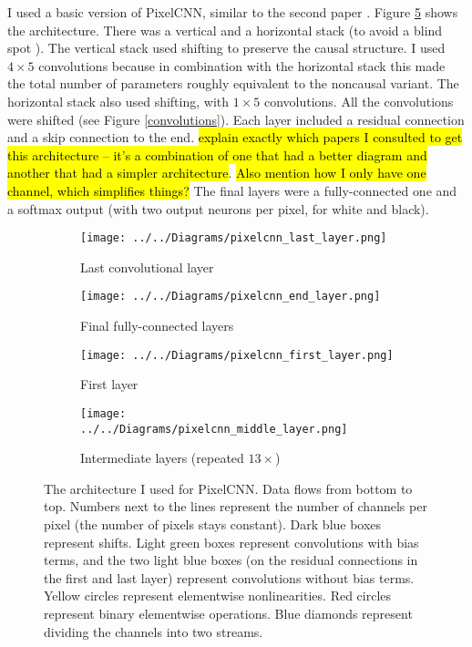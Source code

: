 \documentclass[11pt, a4paper]{book}
\begin{document}
I used a basic version of PixelCNN, similar to the second paper \citep{pixelcnn2}. Figure \ref{pixelcnn} shows the architecture. There was a vertical and a horizontal stack (to avoid a blind spot \citep{pixelcnn2}). The vertical stack used shifting to preserve the causal structure. I used $4\times 5$ convolutions because in combination with the horizontal stack this made the total number of parameters roughly equivalent to the noncausal variant. The horizontal stack also used shifting, with $1\times 5$ convolutions. All the convolutions were shifted (see Figure \ref{convolutions}). Each layer included a residual connection and a skip connection to the end. \hl{explain exactly which papers I consulted to get this architecture -- it's a combination of one that had a better diagram and another that had a simpler architecture}. \hl{Also mention how I only have one channel, which simplifies things?} The final layers were a fully-connected one and a softmax output (with two output neurons per pixel, for white and black).

\begin{figure}
  \centering
    \begin{subfigure}{0.45\columnwidth}
    	\addtocounter{subfigure}{2}
        \centering
        \caption{Last convolutional layer}
        \texttt{[image: ../../Diagrams/pixelcnn\_last\_layer.png]} 
        \label{pixelcnn:last}
    \end{subfigure}
    \hfill
    \begin{subfigure}{0.45\columnwidth}
        \centering
        \caption{Final fully-connected layers}
        \texttt{[image: ../../Diagrams/pixelcnn\_end\_layer.png]} 
        \label{pixelcnn:end}
    \end{subfigure}
    \vspace{1cm}
    \addtocounter{subfigure}{-4}
    \begin{subfigure}{0.45\columnwidth}
        \centering
        \caption{First layer}
        \texttt{[image: ../../Diagrams/pixelcnn\_first\_layer.png]} 
        \label{pixelcnn:first}
    \end{subfigure}
    \hfill
    \begin{subfigure}{0.45\columnwidth}
        \centering
        \caption{Intermediate layers (repeated $13\times$)}
        \texttt{[image: ../../Diagrams/pixelcnn\_middle\_layer.png]} 
        \label{pixelcnn:middle}
    \end{subfigure}
  \caption[Architecture of PixelCNN]{The architecture I used for PixelCNN. Data flows from bottom to top. Numbers next to the lines represent the number of channels per pixel (the number of pixels stays constant). Dark blue boxes represent shifts. Light green boxes represent convolutions with bias terms, and the two light blue boxes (on the residual connections in the first and last layer) represent convolutions without bias terms. Yellow circles represent elementwise nonlinearities. Red circles represent binary elementwise operations. Blue diamonds represent dividing the channels into two streams.}
  \label{pixelcnn}
\end{figure}
\end{document}

